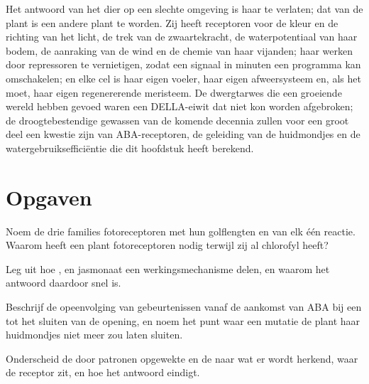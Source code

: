 \begin{remark}\label{rem:b3:plant-molecular-physiology:remark}
Het antwoord van het dier op een slechte omgeving is haar te verlaten;
dat van de plant is een andere plant te worden. Zij heeft receptoren
voor de kleur en de richting van het licht, de trek van de
zwaartekracht, de waterpotentiaal van haar bodem, de aanraking van de
wind en de chemie van haar vijanden; haar  werken door
repressoren te vernietigen, zodat een signaal in minuten een programma
kan omschakelen; en elke cel is haar eigen voeler, haar eigen
afweersysteem en, als het moet, haar eigen regenererende meristeem. De
dwergtarwes die een groeiende wereld hebben gevoed waren een
DELLA-eiwit dat niet kon worden afgebroken; de droogtebestendige
gewassen van de komende decennia zullen voor een groot deel een kwestie
zijn van ABA-receptoren, de geleiding van de huidmondjes en de
watergebruiksefficiëntie die dit hoofdstuk heeft berekend.
\end{remark}

\section{Opgaven}

\begin{exercise}[$\star$]\label{exo:b3:plant-molecular-physiology:1}
Noem de drie families fotoreceptoren met hun golflengten en van elk één
reactie. Waarom heeft een plant fotoreceptoren nodig terwijl zij al
chlorofyl heeft?
\end{exercise}

\begin{exercise}[$\star$]\label{exo:b3:plant-molecular-physiology:2}
Leg uit hoe ,  en jasmonaat een werkingsmechanisme
delen, en waarom het antwoord daardoor snel is.
\end{exercise}

\begin{exercise}[$\star$]\label{exo:b3:plant-molecular-physiology:3}
Beschrijf de opeenvolging van gebeurtenissen vanaf de aankomst van ABA
bij een  tot het sluiten van de opening, en noem het punt waar
een mutatie de plant haar huidmondjes niet meer zou laten sluiten.
\end{exercise}

\begin{exercise}[$\star$]\label{exo:b3:plant-molecular-physiology:4}
Onderscheid de door patronen opgewekte en de  naar wat er wordt herkend, waar de receptor zit, en hoe het
antwoord eindigt.
\end{exercise}

